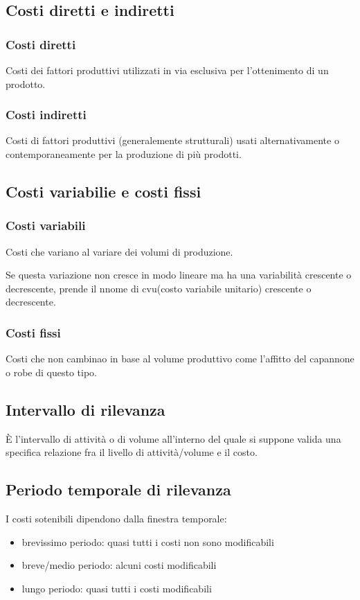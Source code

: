 \subsection{Costi diretti e indiretti}
\subsubsection{Costi diretti}
Costi dei fattori produttivi utilizzati in via esclusiva per l'ottenimento di un prodotto.


\subsubsection{Costi indiretti}
Costi di fattori produttivi (generalemente strutturali) usati alternativamente o contemporaneamente
per la produzione di più prodotti.

\subsection{Costi variabilie e costi fissi}
\subsubsection{Costi variabili}
Costi che variano al variare dei volumi di produzione.

Se questa variazione non cresce in modo lineare ma ha una variabilità crescente o decrescente, 
prende il nnome di cvu(costo variabile unitario) crescente o decrescente.

\subsubsection{Costi fissi}
Costi che non cambinao in base al volume produttivo come l'affitto del capannone o robe di questo tipo.

\subsection{Intervallo di rilevanza}
È l'intervallo di attività o di volume all'interno del quale si suppone
valida una specifica relazione fra il livello di attività/volume e il costo.


\subsection{Periodo temporale di rilevanza}
I costi sotenibili dipendono dalla finestra temporale:
\begin{itemize}
    \item brevissimo periodo: quasi tutti i costi non sono modificabili
    \item breve/medio periodo: alcuni costi modificabili
    \item lungo periodo: quasi tutti i costi modificabili
\end{itemize}

